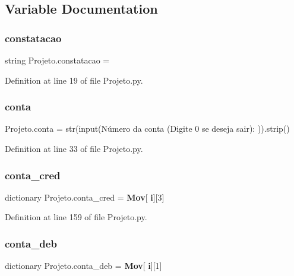 \subsection{Variable Documentation}
\mbox{\label{namespace_projeto_a34f42a46d1d9fcd7cc5a1ccb7a6a83dd}} 
\subsubsection{constatacao}
{\footnotesize\ttfamily string Projeto.\+constatacao = \textquotesingle{}\textquotesingle{}}



Definition at line 19 of file Projeto.\+py.

\mbox{\label{namespace_projeto_ae26407d7e3be564d0e34bb7903dd9250}} 
\subsubsection{conta}
{\footnotesize\ttfamily Projeto.\+conta = str(input(\textquotesingle{}Número da conta (Digite 0 se deseja sair)\+: \textquotesingle{})).strip()}



Definition at line 33 of file Projeto.\+py.

\mbox{\label{namespace_projeto_a703b256a370c03db18ca15392beda1b3}} 
\subsubsection{conta\_cred}
{\footnotesize\ttfamily dictionary Projeto.\+conta\+\_\+cred = \textbf{ Mov}[\textbf{ i}][3]}



Definition at line 159 of file Projeto.\+py.

\mbox{\label{namespace_projeto_ac81ed4a1f743f3e2b3784f788182c34b}} 
\subsubsection{conta\_deb}
{\footnotesize\ttfamily dictionary Projeto.\+conta\+\_\+deb = \textbf{ Mov}[\textbf{ i}][1]}



